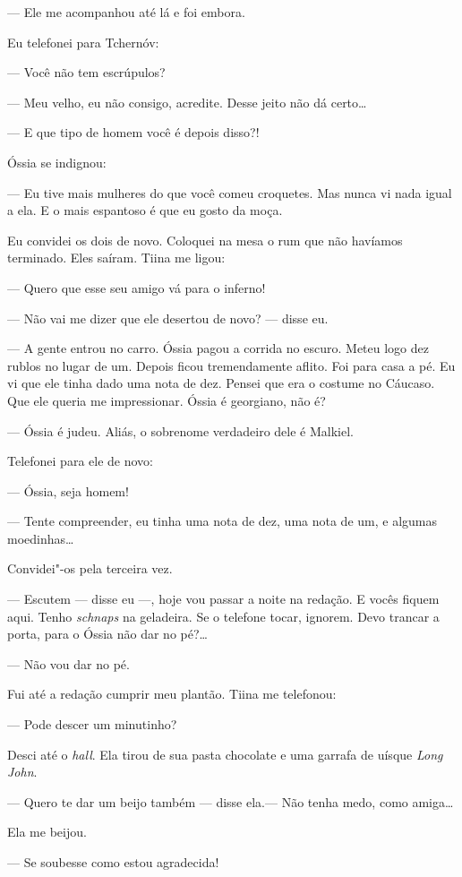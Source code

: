 --- Ele me acompanhou até lá e foi embora.

Eu telefonei para Tchernóv:

--- Você não tem escrúpulos?

--- Meu velho, eu não consigo, acredite. Desse jeito não dá certo\ldots{}

--- E que tipo de homem você é depois disso?!

Óssia se indignou:

--- Eu tive mais mulheres do que você comeu croquetes. Mas nunca vi nada
igual a ela. E o mais espantoso é que eu gosto da moça.

Eu convidei os dois de novo. Coloquei na mesa o rum que não havíamos
terminado. Eles saíram. Tiina me ligou:

--- Quero que esse seu amigo vá para o inferno!

--- Não vai me dizer que ele desertou de novo? --- disse eu.

--- A gente entrou no carro. Óssia pagou a corrida no escuro. Meteu logo
dez rublos no lugar de um. Depois ficou tremendamente aflito. Foi para
casa a pé. Eu vi que ele tinha dado uma nota de dez. Pensei que era o
costume no Cáucaso. Que ele queria me impressionar. Óssia é georgiano,
não é?

--- Óssia é judeu. Aliás, o sobrenome verdadeiro dele é Malkiel.

Telefonei para ele de novo:

--- Óssia, seja homem!

--- Tente compreender, eu tinha uma nota de dez, uma nota de um, e
algumas moedinhas\ldots{}

Convidei"-os pela terceira vez.

--- Escutem --- disse eu ---, hoje vou passar a noite na redação. E
vocês fiquem aqui. Tenho \emph{schnaps} na geladeira. Se o telefone
tocar, ignorem. Devo trancar a porta, para o Óssia não dar no pé?\ldots{}

--- Não vou dar no pé.

Fui até a redação cumprir meu plantão. Tiina me telefonou:

--- Pode descer um minutinho?

Desci até o \emph{hall}. Ela tirou de sua pasta chocolate e uma garrafa
de uísque \emph{Long John}.

--- Quero te dar um beijo também --- disse ela.--- Não tenha medo, como
amiga\ldots{}

Ela me beijou.

--- Se soubesse como estou agradecida!

